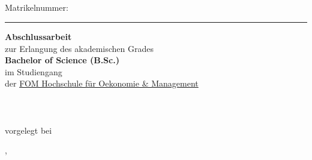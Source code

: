\begin{titlepage}
\begin{center}
\begin{spacing}{1.8}
    {\sffamily\bfseries\LARGE\daTitelEins}\\ %
    {\sffamily\bfseries\LARGE\daTitelZwei}\\ %
    {\sffamily\bfseries\LARGE\daTitelDrei}\\ %
	{\sffamily\LARGE\daAutor}\\ %
	{\sffamily\large Matrikelnummer: \daMatrikelnummer}\\ %
  \end{spacing}%
  \hrule
  \begin{spacing}{1.1}
    {\sffamily\bfseries\Large Abschlussarbeit}\\ %
    {\large zur Erlangung des akademischen Grades}\\
    {\large\bfseries Bachelor of Science (B.Sc.)}\\
  	{\large im Studiengang {\large \daStudiengang}} \\%
  	{\large der \href{\daUniURL}{FOM Hochschule für Oekonomie \& Management}} \\%
    {\normalsize\daAutor}\\%
    {\normalsize\daAutorAdresse}\\%
    {\normalsize\daAutorPLZ~\daAutorOrt}\\%
    {\small vorgelegt bei}\\%
    {\normalsize\daGutachterEins}\par%
  \end{spacing}
  {\normalsize \daAutorOrt, \daDate}
\end{center}


\end{titlepage}
